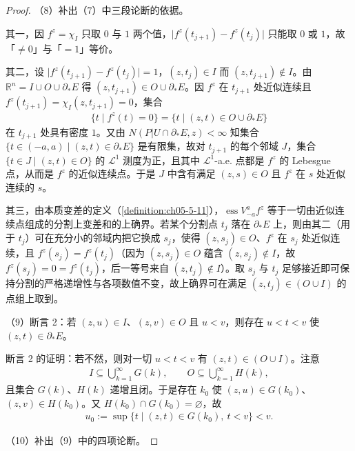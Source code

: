 \documentclass[../../main.tex]{subfiles}%
\begin{document}
\begin{proof}
（8）补出（7）中三段论断的依据。

其一，因 $f^z=\chi_I$ 只取 $0$ 与 $1$ 两个值，$\lvert f^z(t_{j+1})-f^z(t_j)\rvert$ 只能取 $0$ 或 $1$，故「$\neq0$」与「$=1$」等价。

其二，设 $\lvert f^z(t_{j+1})-f^z(t_j)\rvert=1$，$(z,t_j)\in I$ 而 $(z,t_{j+1})\notin I$。由 $\mathbb{R}^n=I\cup O\cup\partial_*E$ 得 $(z,t_{j+1})\in O\cup\partial_*E$。因 $f^z$ 在 $t_{j+1}$ 处近似连续且 $f^z(t_{j+1})=\chi_I(z,t_{j+1})=0$，集合
\begin{align*}
\{t\mid f^z(t)=0\}=\{t\mid(z,t)\in O\cup\partial_*E\}
\end{align*}
在 $t_{j+1}$ 处具有密度 $1$。又由 $N(P|U\cap\partial_*E,z)<\infty$ 知集合 $\{t\in(-a,a)\mid(z,t)\in\partial_*E\}$ 是有限集，故对 $t_{j+1}$ 的每个邻域 $J$，集合 $\{t\in J\mid(z,t)\in O\}$ 的 $\mathcal{L}^1$ 测度为正，且其中 $\mathcal{L}^1$-a.e. 点都是 $f^z$ 的 Lebesgue 点，从而是 $f^z$ 的近似连续点。于是 $J$ 中含有满足 $(z,s)\in O$ 且 $f^z$ 在 $s$ 处近似连续的 $s$。

其三，由本质变差的定义（\cref{definition:ch05-5-11}），$\operatorname{ess}V_{-a}^{a}f^z$ 等于一切由近似连续点组成的分割上变差和的上确界。若某个分割点 $t_j$ 落在 $\partial_*E$ 上，则由其二（用于 $t_j$）可在充分小的邻域内把它换成 $s_j$，使得 $(z,s_j)\in O$、$f^z$ 在 $s_j$ 处近似连续，且 $f^z(s_j)=f^z(t_j)$（因为 $(z,s_j)\in O$ 蕴含 $(z,s_j)\notin I$，故 $f^z(s_j)=0=f^z(t_j)$，后一等号来自 $(z,t_j)\notin I$）。取 $s_j$ 与 $t_j$ 足够接近即可保持分割的严格递增性与各项数值不变，故上确界可在满足 $(z,t_j)\in(O\cup I)$ 的点组上取到。 %

（9）断言 2：若 $(z,u)\in I$、$(z,v)\in O$ 且 $u<v$，则存在 $u<t<v$ 使 $(z,t)\in\partial_*E$。

断言 2 的证明：若不然，则对一切 $u<t<v$ 有 $(z,t)\in(O\cup I)$。注意
\begin{align*}
I\subseteq\bigcup_{k=1}^{\infty}G(k),\qquad O\subseteq\bigcup_{k=1}^{\infty}H(k),
\end{align*}
且集合 $G(k)$、$H(k)$ 递增且闭。于是存在 $k_0$ 使 $(z,u)\in G(k_0)$、$(z,v)\in H(k_0)$。又 $H(k_0)\cap G(k_0)=\varnothing$，故
\begin{align*}
u_0:=\sup\{t\mid(z,t)\in G(k_0),\ t<v\}<v .
\end{align*}

（10）补出（9）中的四项论断。


\end{proof}
\end{document}
